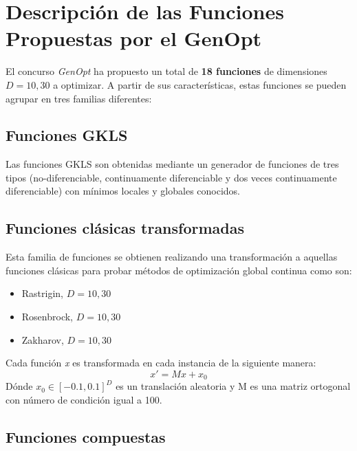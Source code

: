 \section{Descripción de las Funciones Propuestas por el GenOpt}
\label{sec:GENOPT}

El concurso \textit{GenOpt} ha propuesto un total de \textbf{18 funciones} de dimensiones $D = 10, 30$ a optimizar. A partir de sus características, estas funciones se pueden agrupar en tres familias diferentes: 

\bigskip
\subsection{Funciones GKLS}\label{sec:GKLS}
Las funciones GKLS \cite{GKLS} son obtenidas mediante un generador de funciones de tres tipos (no-diferenciable, continuamente diferenciable y dos veces continuamente diferenciable) con mínimos locales y globales conocidos.
 
\subsection{Funciones clásicas transformadas}

Esta familia de funciones se obtienen realizando una transformación a aquellas funciones clásicas para probar métodos de optimización global continua como son:
    \begin{itemize}
    	\item Rastrigin, $D = 10, 30$ 
    	\item Rosenbrock, $D = 10, 30$ 
    	\item Zakharov, $D = 10, 30$ 
    \end{itemize}
    Cada función \textit{x} es transformada en cada instancia de la siguiente manera: 
    \begin{equation}
    x' = Mx + x_{0}
    \end{equation}
    Dónde $x_{0}\in[-0.1, 0.1]^{D}$ es un translación aleatoria y M es una matriz ortogonal con número de condición igual a 100.

\subsection{Funciones compuestas} 

